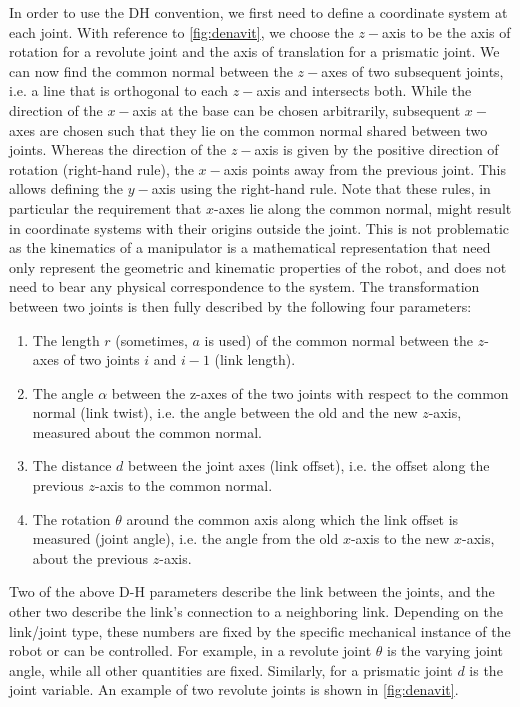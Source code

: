 In order to use the DH convention, we first need to define a coordinate system at each joint. With reference to \cref{fig:denavit}, we choose the $z-$axis to be the axis of rotation for a revolute joint and the axis of translation for a prismatic joint.
We can now find the common normal between the $z-$axes of two subsequent joints, i.e. a line that is orthogonal to each $z-$axis and intersects both.
While the direction of the $x-$axis at the base can be chosen arbitrarily, subsequent $x-$axes are chosen such that they lie on the common normal shared between two joints.
Whereas the direction of the $z-$axis is given by the positive direction of rotation (right-hand rule), the $x-$axis points away from the previous joint.
This allows defining the $y-$axis using the right-hand rule.
Note that these rules, in particular the requirement that $x$-axes lie along the common normal, might result in coordinate systems with their origins outside the joint. This is not problematic as the kinematics of a manipulator is a mathematical representation that need only represent the geometric and kinematic properties of the robot, and does not need to bear any physical correspondence to the system.
%
The transformation between two joints is then fully described by the following four parameters:
\begin{enumerate}
\item The length $r$ (sometimes, $a$ is used) of the common normal between the $z$-axes of two joints $i$ and $i-1$ (link length).
\item The angle $ \alpha$ between the z-axes of the two joints with respect to the common normal (link twist), i.e. the angle between the old and the new $z$-axis, measured about the common normal.
\item The distance $d$ between the joint axes (link offset), i.e. the offset along the previous $z$-axis to the common normal.
\item The rotation $ \theta$ around the common axis along which the link offset is measured (joint angle), i.e. the angle from the old $x$-axis to the new $x$-axis, about the previous $z$-axis.
\end{enumerate}

Two of the above D-H parameters describe the link between the joints, and the other two describe the link's connection to a neighboring link.
Depending on the link/joint type, these numbers are fixed by the specific mechanical instance of the robot or can be controlled.
For example, in a revolute joint $ \theta$ is the varying joint angle, while all other quantities are fixed.  Similarly, for a prismatic joint $d$ is the joint variable. An example of two revolute joints is shown in \cref{fig:denavit}.

